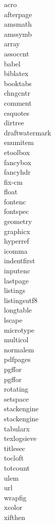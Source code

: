 \begin{appendices}
\begin{multicols}{3}
    \noindent
    acro\\
    afterpage\\
    amsmath\\
    amssymb\\
    array\\
    assoccnt\\
    babel\\
    biblatex\\
    booktabs\\
    chngcntr\\
    comment\\
    csquotes\\
    dirtree\\
    draftwatermark\\
    enumitem\\
    etoolbox\\
    fancybox\\
    fancyhdr\\
    fix-cm\\
    float\\
    fontenc\\
    fontspec\\
    geometry\\
    graphicx\\
    hyperref\\
	icomma\\
    indentfirst\\
    inputenc\\
    lastpage\\
    listings\\
    listingsutf8\\
    longtable\\
    lscape\\
    microtype\\
    multicol\\
    normalem\\
    pdfpages\\
    pgffor\\
    pgffor\\
    rotating\\
    setspace\\
    stackengine\\
    stackengine\\
    tabularx\\
    texlogsieve\\
    titlesec\\
    tocloft\\
    totcount\\
    ulem\\
    url\\
    wrapfig\\
    xcolor\\
    xifthen

\end{multicols}
\end{appendices}